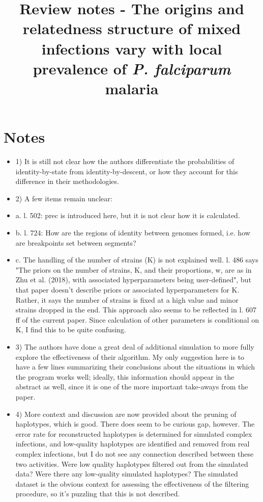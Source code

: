 \documentclass[11pt,twoside,a4paper]{article}
\begin{document}
\title{Review notes - The origins and relatedness structure of mixed infections vary with local prevalence of {\it P. falciparum} malaria}
\newcommand\shorttitle{Review}
\date{}
\maketitle{}
\section{Notes}

\begin{itemize}

    \item 1) It is still not clear how the authors differentiate the probabilities of identity-by-state from identity-by-descent, or how they account for this difference in their methodologies. 

    \item 2) A few items remain unclear: 

    \item a. l. 502: prec is introduced here, but it is not clear how it is calculated. 

    \item b. l. 724: How are the regions of identity between genomes formed, i.e. how are breakpoints set between segments? 

    \item c. The handling of the number of strains (K) is not explained well. l. 486 says "The priors on the number of strains, K, and their proportions, w, are as in Zhu et al. (2018), with associated hyperparameters being user-defined", but that paper doesn't describe priors or associated hyperparameters for K. Rather, it says the number of strains is fixed at a high value and minor strains dropped in the end. This approach also seems to be reflected in l. 607 ff of the current paper. Since calculation of other parameters is conditional on K, I find this to be quite confusing. 

    \item 3) The authors have done a great deal of additional simulation to more fully explore the effectiveness of their algorithm. My only suggestion here is to have a few lines summarizing their conclusions about the situations in which the program works well; ideally, this information should appear in the abstract as well, since it is one of the more important take-aways from the paper. 

    \item 4) More context and discussion are now provided about the pruning of haplotypes, which is good. There does seem to be curious gap, however. The error rate for reconstructed haplotypes is determined for simulated complex infections, and low-quality haplotypes are identified and removed from real complex infections, but I do not see any connection described between these two activities. Were low quality haplotypes filtered out from the simulated data? Were there any low-quality simulated haplotypes? The simulated dataset is the obvious context for assessing the effectiveness of the filtering procedure, so it's puzzling that this is not described. 


\end{itemize}
\end{document}
